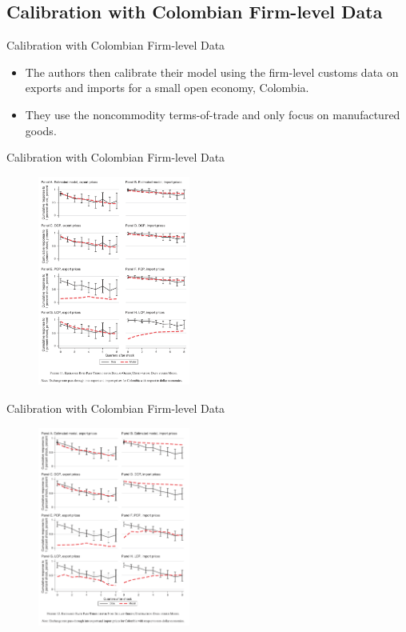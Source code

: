 \documentclass{beamer}
\begin{document}
\subsection{Calibration with Colombian Firm-level Data}
\begin{frame}{Calibration with Colombian Firm-level Data}
    \begin{itemize}
        \item The authors then calibrate their model using the firm-level customs data on exports and imports for a small open economy, Colombia.
        \item They use the noncommodity terms-of-trade and only focus on manufactured goods.
    \end{itemize}
\end{frame}
\begin{frame}{Calibration with Colombian Firm-level Data}
    \begin{figure}[htp]
        \centering
        \includegraphics[width=5cm]{Figure11.png}
    \end{figure}
\end{frame}
\begin{frame}{Calibration with Colombian Firm-level Data}
    \begin{figure}[htp]
        \centering
        \includegraphics[width=5cm]{Figure12.png}
    \end{figure}
\end{frame}
\end{document}
